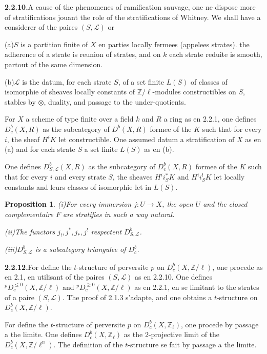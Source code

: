 \documentclass[12pt,a4paper]{article}
\theoremstyle{plain}
\newtheorem{proposition}[theorem]{Proposition}
\theoremstyle{definition}
\begin{document}
\smallskip
\noindent\textbf{2.2.10.}\quad A cause of the phenomenes of ramification sauvage, one ne dispose more of stratifications jouant the role of the stratifications of Whitney. We shall have a considerer of the paires $(S, \mathcal{L})$ or

(a)\quad $S$ is a partition finite of $X$ en parties locally fermees (appelees strates). the adherence of a strate is reunion of strates, and on $\overline{k}$ each strate reduite is smooth, partout of the same dimension.

(b)\quad $\mathcal{L}$ is the datum, for each strate $S$, of a set finite $L(S)$ of classes of isomorphie of sheaves locally constants of $\mathbb{Z}/\ell$-modules constructibles on $S$, stables by $\otimes$, duality, and passage to the under-quotients.

For $X$ a scheme of type finite over a field $k$ and $R$ a ring as en 2.2.1, one defines $D_c^b(X, R)$ as the subcategory of $D^b(X, R)$ formee of the $K$ such that for every $i$, the sheaf $H^i K$ let constructible. One assumed datum a stratification of $X$ as en (a) and for each strate $S$ a set finite $L(S)$ as en (b).

One defines $D_{S, \mathcal{L}}^b(X, R)$ as the subcategory of $D_c^b(X, R)$ formee of the $K$ such that for every $i$ and every strate $S$, the sheaves $H^i i_S^* K$ and $H^i i_S^! K$ let locally constants and leurs classes of isomorphie let in $L(S)$.

\begin{proposition}\label{prop:2.2.11}
\emph{(i)}\quad For every immersion $j : U \to X$, the open $U$ and the closed complementaire $F$ are stratifies in such a way natural.

\emph{(ii)}\quad The functors $j_!, j^*, j_*, j^!$ respectent $D_{S, \mathcal{L}}^b$.

\emph{(iii)}\quad $D_{S, \mathcal{L}}^b$ is a subcategory triangulee of $D_c^b$.
\end{proposition}

\smallskip
\noindent\textbf{2.2.12.}\quad For define the $t$-structure of perversite $p$ on $D_c^b(X, \mathbb{Z}/\ell)$, one procede as en 2.1, en utilisant of the paires $(S, \mathcal{L})$ as en 2.2.10. One defines ${}^p D_c^{\leqslant 0}(X, \mathbb{Z}/\ell)$ and ${}^p D_c^{\geqslant 0}(X, \mathbb{Z}/\ell)$ as en 2.2.1, en se limitant to the strates of a paire $(S, \mathcal{L})$. The proof of 2.1.3 s'adapte, and one obtains a $t$-structure on $D_c^b(X, \mathbb{Z}/\ell)$.

For define the $t$-structure of perversite $p$ on $D_c^b(X, \mathbb{Z}_\ell)$, one procede by passage a the limite. One defines $D_c^b(X, \mathbb{Z}_\ell)$ as the 2-projective limit of the $D_c^b(X, \mathbb{Z}/\ell^n)$. The definition of the $t$-structure se fait by passage a the limite.
\end{document}
